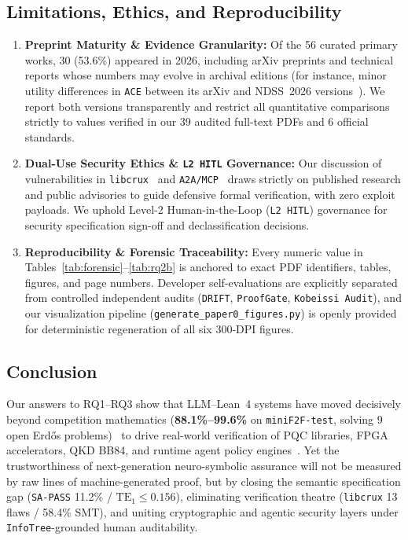 \documentclass[10pt,twocolumn]{article}
\begin{document}
\subsection{Limitations, Ethics, and Reproducibility}
\label{sec:limitations}

\begin{enumerate}
  \item \textbf{Preprint Maturity \& Evidence Granularity:} Of the 56 curated primary works, 30 (53.6\%) appeared in 2026, including arXiv preprints and technical reports whose numbers may evolve in archival editions (for instance, minor utility differences in \texttt{ACE} between its arXiv and NDSS~2026 versions~\cite{li2026ace}). We report both versions transparently and restrict all quantitative comparisons strictly to values verified in our 39 audited full-text PDFs and 6 official standards.
  \item \textbf{Dual-Use Security Ethics \& \texttt{L2 HITL} Governance:} Our discussion of vulnerabilities in \texttt{libcrux}~\cite{kobeissi2026theatre} and \texttt{A2A/MCP}~\cite{lotfi2026a2abreak,agentthread2026} draws strictly on published research and public advisories to guide defensive formal verification, with zero exploit payloads. We uphold Level-2 Human-in-the-Loop (\texttt{L2 HITL}) governance for security specification sign-off and declassification decisions.
  \item \textbf{Reproducibility \& Forensic Traceability:} Every numeric value in Tables~\ref{tab:forensic}--\ref{tab:rq2b} is anchored to exact PDF identifiers, tables, figures, and page numbers. Developer self-evaluations are explicitly separated from controlled independent audits (\texttt{DRIFT}, \texttt{ProofGate}, \texttt{Kobeissi Audit}), and our visualization pipeline (\texttt{generate\_paper0\_figures.py}) is openly provided for deterministic regeneration of all six 300-DPI figures.
\end{enumerate}

\subsection{Conclusion}
\label{sec:conclusion}

Our answers to RQ1--RQ3 show that LLM--Lean~4 systems have moved decisively beyond competition mathematics (\textbf{88.1\%--99.6\%} on \texttt{miniF2F-test}, solving 9 open Erd\H{o}s problems)~\cite{tsoukalas2026nexus,ren2025deepseekproverv2,lin2026goedelproverv2,chung2026goedelarchitect,chen2025seedprover,chen2025seedprover15} to drive real-world verification of PQC libraries, FPGA accelerators, QKD BB84, and runtime agent policy engines~\cite{ho2026symcrypt,chaudhuri2026alphaproofcode,park2026pqchw,benshahar2026qkd,debenedetti2026camel,li2025drift,costa2025fides,zhong2025rtbas,shi2025progent,li2026ace,abdelnabi2026ci,wang2026lean4agent}. Yet the trustworthiness of next-generation neuro-symbolic assurance will not be measured by raw lines of machine-generated proof, but by closing the semantic specification gap (\texttt{SA-PASS} 11.2\% / $\mathrm{TE}_1 \le 0.156$), eliminating verification theatre (\texttt{libcrux} 13 flaws / 58.4\% SMT), and uniting cryptographic and agentic security layers under \texttt{InfoTree}-grounded human auditability.

\FloatBarrier
{\footnotesize
\setlength{\bibsep}{2pt plus 0.5pt minus 0.5pt}


}
\end{document}
